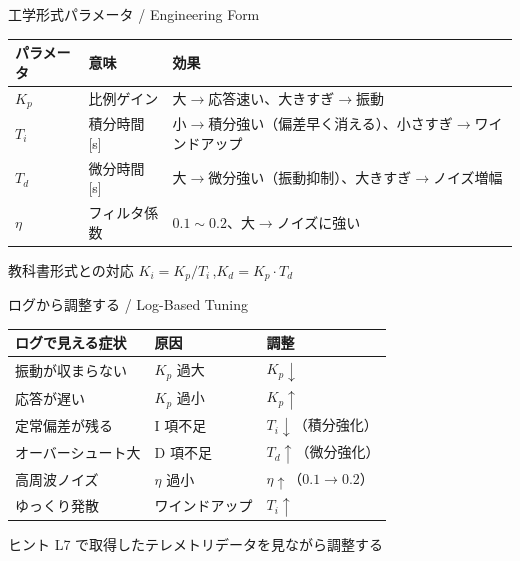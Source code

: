 \begin{frame}{工学形式パラメータ / Engineering Form}
  \begin{table}
    \centering
    \footnotesize
    \begin{tabular}{llp{55mm}}
      \hline
      \textbf{パラメータ} & \textbf{意味} & \textbf{効果} \\
      \hline
      $K_p$  & 比例ゲイン   & 大$\to$応答速い、大きすぎ$\to$振動 \\
      $T_i$  & 積分時間 [s] & 小$\to$積分強い（偏差早く消える）、小さすぎ$\to$ワインドアップ \\
      $T_d$  & 微分時間 [s] & 大$\to$微分強い（振動抑制）、大きすぎ$\to$ノイズ増幅 \\
      $\eta$ & フィルタ係数  & $0.1 \sim 0.2$、大$\to$ノイズに強い \\
      \hline
    \end{tabular}
  \end{table}

  \vspace{0.5em}

  \begin{block}{教科書形式との対応}
    $K_i = K_p / T_i$\,,\quad $K_d = K_p \cdot T_d$
  \end{block}
\end{frame}

\begin{frame}{ログから調整する / Log-Based Tuning}
  \begin{table}
    \centering
    \footnotesize
    \begin{tabular}{lll}
      \hline
      \textbf{ログで見える症状} & \textbf{原因} & \textbf{調整} \\
      \hline
      振動が収まらない   & $K_p$ 過大          & $K_p\!\downarrow$ \\
      応答が遅い         & $K_p$ 過小          & $K_p\!\uparrow$ \\
      定常偏差が残る     & I 項不足            & $T_i\!\downarrow$（積分強化）\\
      オーバーシュート大 & D 項不足            & $T_d\!\uparrow$（微分強化）\\
      高周波ノイズ       & $\eta$ 過小         & $\eta\!\uparrow$（$0.1\!\to\!0.2$）\\
      ゆっくり発散       & ワインドアップ      & $T_i\!\uparrow$ \\
      \hline
    \end{tabular}
  \end{table}

  \vspace{0.5em}

  \begin{block}{ヒント}
    L7 で取得したテレメトリデータを見ながら調整する
  \end{block}
\end{frame}

